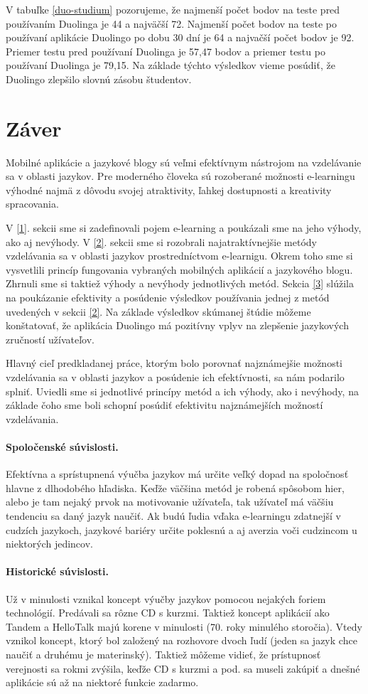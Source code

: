 \documentclass[10pt,oneside,slovak,a4paper]{article}
\begin{document}
V tabuľke \ref{duo-studium} pozorujeme, že najmenší počet bodov na teste pred používaním Duolinga je 44 a najväčší 72. Najmenší počet bodov na teste po používaní aplikácie  Duolingo po dobu 30 dní je 64 a najvačší počet bodov je 92. Priemer testu pred používaní Duolinga je 57,47 bodov a priemer testu po používaní Duolinga je 79,15. \cite{duolingo} Na základe týchto výsledkov vieme posúdiť, že Duolingo zlepšilo slovnú zásobu študentov.

\section*{Záver}
Mobilné aplikácie a jazykové blogy sú veľmi efektívnym nástrojom na vzdelávanie sa v oblasti jazykov. Pre moderného človeka sú rozoberané možnosti e-learningu výhodné najmä z dôvodu svojej atraktivity, ľahkej dostupnosti a kreativity spracovania.

V \ref{1}. sekcii sme si zadefinovali pojem e-learning a poukázali sme na jeho výhody, ako aj nevýhody. V \ref{2}. sekcii sme si rozobrali najatraktívnejšie metódy vzdelávania sa v oblasti jazykov prostredníctvom e-learnigu. Okrem toho sme si vysvetlili princíp fungovania vybraných mobilných aplikácií a jazykového blogu. Zhrnuli sme si taktiež výhody a nevýhody jednotlivých metód. Sekcia \ref{3} slúžila na poukázanie efektivity a posúdenie výsledkov používania jednej z metód uvedených v sekcii \ref{2}. Na základe výsledkov skúmanej štúdie môžeme konštatovať, že aplikácia Duolingo má pozitívny vplyv na zlepšenie jazykových zručností užívateľov. 

Hlavný cieľ predkladanej práce, ktorým bolo porovnať najznámejšie možnosti vzdelávania sa v oblasti jazykov a posúdenie ich efektívnosti, sa nám podarilo splniť. Uviedli sme si jednotlivé princípy metód a ich výhody, ako i nevýhody, na základe čoho sme boli schopní posúdiť efektivitu najznámejších možností vzdelávania.
\paragraph{Spoločenské súvislosti.}
Efektívna a sprístupnená výučba jazykov má určite veľký dopad na spoločnosť hlavne z dlhodobého hľadiska. Keďže väčšina metód je robená spôsobom hier, alebo je tam nejaký prvok na motivovanie užívateľa, tak užívateľ má väčšiu tendenciu sa daný jazyk naučiť. Ak budú ľudia vďaka e-learningu zdatnejší v cudzích jazykoch, jazykové bariéry určite poklesnú a aj averzia voči cudzincom u niektorých jedincov.
\paragraph{Historické súvislosti.}
Už v minulosti vznikal koncept výučby jazykov pomocou nejakých foriem technológií. Predávali sa rôzne CD s kurzmi. Taktiež koncept aplikácií ako Tandem a HelloTalk majú korene v minulosti (70. roky minulého storočia). Vtedy vznikol koncept, ktorý bol založený na rozhovore dvoch ľudí (jeden sa jazyk chce naučiť a druhému je materinský). Taktiež môžeme vidieť, že prístupnosť verejnosti sa rokmi zvýšila, keďže CD s kurzmi a pod. sa museli zakúpiť a dnešné aplikácie sú až na niektoré funkcie zadarmo.
\end{document}
